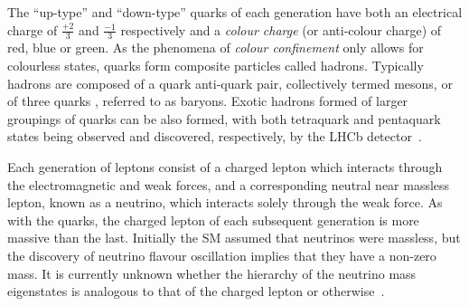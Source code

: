The ``up-type'' and ``down-type'' quarks of each generation have both an electrical charge of $\frac{+2}{3}$ and $\frac{-1}{3}$  respectively and a \emph{colour charge} (or anti-colour charge) of red, blue or green.
As the phenomena of \emph{colour confinement} only allows for colourless states, quarks form composite particles called hadrons.
Typically hadrons are composed of a quark anti-quark pair, collectively termed mesons, or of three quarks , referred to as baryons.
Exotic hadrons formed of larger groupings of quarks can be also formed, with both tetraquark and pentaquark states being observed and discovered, respectively, by the LHCb detector~\cite{Aaij:2014jqa,Aaij:2015tga}.

Each generation of leptons consist of a charged lepton which interacts through the electromagnetic and weak forces, and a corresponding neutral near massless lepton, known as a neutrino, which interacts solely through the weak force.
As with the quarks, the charged lepton of each subsequent generation is more massive than the last.
Initially the SM assumed that neutrinos were massless, but the discovery of neutrino flavour oscillation implies that they have a non-zero mass. 
It is currently unknown whether the hierarchy of the neutrino mass eigenstates is analogous to that of the charged lepton or otherwise~\cite{Nath:2018rqn}.

